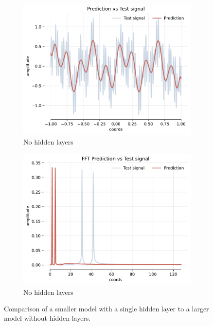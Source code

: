 \begin{figure}[h!]
    \begin{subfigure}[b]{0.40\textwidth}
        \centering
        \includegraphics[width=\textwidth]{img/ch4/prediction_0hl_1024hf_w10.pdf}
        \caption{No hidden layers}
        \label{fig:rec-0hl-1024-w10hf}
    \end{subfigure}
    \begin{subfigure}[b]{0.40\textwidth}
        \centering
        \includegraphics[width=\textwidth]{img/ch4/fft_0hl_1024hf_w10.pdf}
        \caption{No hidden layers}
        \label{fig:fft-0hl-1024-w10hf}
    \end{subfigure}
    \caption{Comparison of a smaller model with a single hidden layer to a larger model without hidden layers.}
    \label{f:hidden-layer-vs-no-hiddel-layer}
\end{figure}

